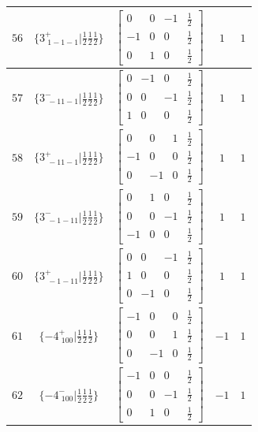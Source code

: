 \documentclass[fleqn,8pt]{jsarticle}
\begin{document}
\begin{longtable}{ccccc}
$ 56 $ & $ \{3^{+}_{\,\,1-1-1}|\frac{1}{2} \frac{1}{2} \frac{1}{2}\} $ & $ \begin{bmatrix} 0 & 0 & -1 & \frac{1}{2} \\ -1 & 0 & 0 & \frac{1}{2} \\ 0 & 1 & 0 & \frac{1}{2} \end{bmatrix} $ & $ 1 $ & $ 1 $ \\ \hline
$ 57 $ & $ \{3^{-}_{\,\,-11-1}|\frac{1}{2} \frac{1}{2} \frac{1}{2}\} $ & $ \begin{bmatrix} 0 & -1 & 0 & \frac{1}{2} \\ 0 & 0 & -1 & \frac{1}{2} \\ 1 & 0 & 0 & \frac{1}{2} \end{bmatrix} $ & $ 1 $ & $ 1 $ \\ \hline
$ 58 $ & $ \{3^{+}_{\,\,-11-1}|\frac{1}{2} \frac{1}{2} \frac{1}{2}\} $ & $ \begin{bmatrix} 0 & 0 & 1 & \frac{1}{2} \\ -1 & 0 & 0 & \frac{1}{2} \\ 0 & -1 & 0 & \frac{1}{2} \end{bmatrix} $ & $ 1 $ & $ 1 $ \\ \hline
$ 59 $ & $ \{3^{-}_{\,\,-1-11}|\frac{1}{2} \frac{1}{2} \frac{1}{2}\} $ & $ \begin{bmatrix} 0 & 1 & 0 & \frac{1}{2} \\ 0 & 0 & -1 & \frac{1}{2} \\ -1 & 0 & 0 & \frac{1}{2} \end{bmatrix} $ & $ 1 $ & $ 1 $ \\ \hline
$ 60 $ & $ \{3^{+}_{\,\,-1-11}|\frac{1}{2} \frac{1}{2} \frac{1}{2}\} $ & $ \begin{bmatrix} 0 & 0 & -1 & \frac{1}{2} \\ 1 & 0 & 0 & \frac{1}{2} \\ 0 & -1 & 0 & \frac{1}{2} \end{bmatrix} $ & $ 1 $ & $ 1 $ \\ \hline
$ 61 $ & $ \{-4^{+}_{\,\,100}|\frac{1}{2} \frac{1}{2} \frac{1}{2}\} $ & $ \begin{bmatrix} -1 & 0 & 0 & \frac{1}{2} \\ 0 & 0 & 1 & \frac{1}{2} \\ 0 & -1 & 0 & \frac{1}{2} \end{bmatrix} $ & $ -1 $ & $ 1 $ \\ \hline
$ 62 $ & $ \{-4^{-}_{\,\,100}|\frac{1}{2} \frac{1}{2} \frac{1}{2}\} $ & $ \begin{bmatrix} -1 & 0 & 0 & \frac{1}{2} \\ 0 & 0 & -1 & \frac{1}{2} \\ 0 & 1 & 0 & \frac{1}{2} \end{bmatrix} $ & $ -1 $ & $ 1 $ \\ \hline

\end{longtable}
\end{document}
